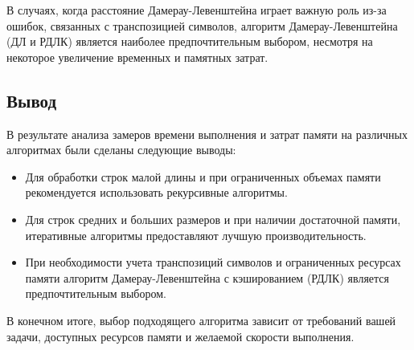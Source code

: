 	В случаях, когда расстояние Дамерау-Левенштейна играет важную роль из-за ошибок, связанных с транспозицией символов, алгоритм Дамерау-Левенштейна (ДЛ и РДЛК) является наиболее предпочтительным выбором, несмотря на некоторое увеличение временных и памятных затрат.

\subsection{Вывод}

В результате анализа замеров времени выполнения и затрат памяти на различных алгоритмах были сделаны следующие выводы:

\begin{itemize}
	\item Для обработки строк малой длины и при ограниченных объемах памяти рекомендуется использовать рекурсивные алгоритмы.
	\item Для строк средних и больших размеров и при наличии достаточной памяти, итеративные алгоритмы предоставляют лучшую производительность.
	\item При необходимости учета транспозиций символов и ограниченных ресурсах памяти алгоритм Дамерау-Левенштейна с кэшированием (РДЛК) является предпочтительным выбором.
\end{itemize}

В конечном итоге, выбор подходящего алгоритма зависит от требований вашей задачи, доступных ресурсов памяти и желаемой скорости выполнения.
